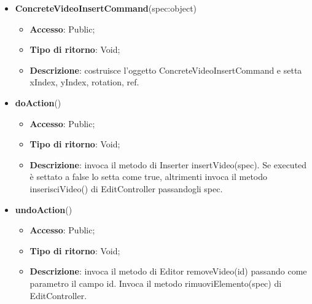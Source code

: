 {{{	
	\begin{itemize}
		\item \textbf{ConcreteVideoInsertCommand}(spec:object)
		\begin{itemize}
			\item \textbf{Accesso}: Public;
			\item \textbf{Tipo di ritorno}: Void;
			\item \textbf{Descrizione}: costruisce l’oggetto ConcreteVideoInsertCommand e setta xIndex, yIndex, rotation, ref.
		\end{itemize}
		\item \textbf{doAction}()
		\begin{itemize}
			\item \textbf{Accesso}: Public;
			\item \textbf{Tipo di ritorno}: Void;
			\item \textbf{Descrizione}: invoca il metodo di Inserter insertVideo(spec). Se executed è settato a false lo setta come true, altrimenti invoca il metodo inserisciVideo() di EditController passandogli spec.
		\end{itemize}
		\item \textbf{undoAction}()
		\begin{itemize}
			\item \textbf{Accesso}: Public;
			\item \textbf{Tipo di ritorno}: Void;
			\item \textbf{Descrizione}: invoca il metodo di Editor removeVideo(id) passando come parametro il campo id. Invoca il metodo rimuoviElemento(spec) di EditController.
		\end{itemize}
	\end{itemize}
	}

}}
